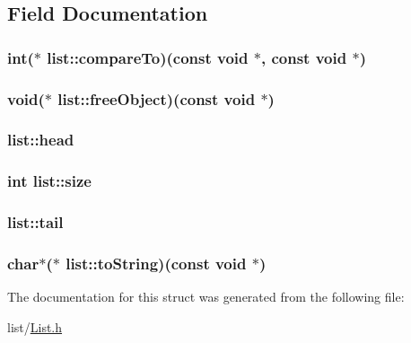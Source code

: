 \subsection{Field Documentation}
\hypertarget{structlist_ad3ad01e7ea22f2e0590e1d5549c8ab7f}{
\subsubsection[{compare\-To}]{\setlength{\rightskip}{0pt plus 5cm}int($\ast$ list\-::compare\-To)(const void $\ast$, const void $\ast$)}}\label{structlist_ad3ad01e7ea22f2e0590e1d5549c8ab7f}
\hypertarget{structlist_a04091cb910e425d1226562197fe0bf8c}{
\subsubsection[{free\-Object}]{\setlength{\rightskip}{0pt plus 5cm}void($\ast$ list\-::free\-Object)(const void $\ast$)}}\label{structlist_a04091cb910e425d1226562197fe0bf8c}
\hypertarget{structlist_a357a56cbe66297fb5cc5cd8ba9fa6cf4}{
\subsubsection[{head}]{ list\-::head}}\label{structlist_a357a56cbe66297fb5cc5cd8ba9fa6cf4}
\hypertarget{structlist_a3b03adad0c0429bae9493667ff366dc2}{
\subsubsection[{size}]{\setlength{\rightskip}{0pt plus 5cm}int list\-::size}}\label{structlist_a3b03adad0c0429bae9493667ff366dc2}
\hypertarget{structlist_a7fba27040dab68e2d6acc2885b6df167}{
\subsubsection[{tail}]{ list\-::tail}}\label{structlist_a7fba27040dab68e2d6acc2885b6df167}
\hypertarget{structlist_a3447393f975f748b5df5247155e9298a}{
\subsubsection[{to\-String}]{\setlength{\rightskip}{0pt plus 5cm}char$\ast$($\ast$ list\-::to\-String)(const void $\ast$)}}\label{structlist_a3447393f975f748b5df5247155e9298a}


The documentation for this struct was generated from the following file\-:\begin{DoxyCompactItemize}
\item 
list/\hyperlink{List_8h}{List.\-h}\end{DoxyCompactItemize}
